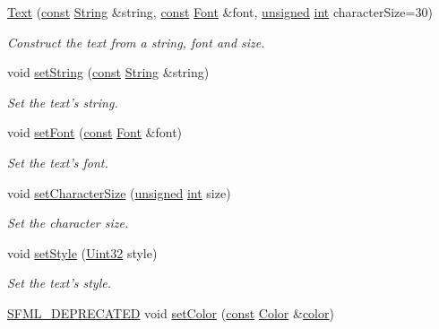 \begin{DoxyCompactItemize}
\hyperlink{classsf_1_1_text_a614019e0b5c0ed39a99d32483a51f2c5}{Text} (\hyperlink{term__entry_8h_a57bd63ce7f9a353488880e3de6692d5a}{const} \hyperlink{classsf_1_1_string}{String} \&string, \hyperlink{term__entry_8h_a57bd63ce7f9a353488880e3de6692d5a}{const} \hyperlink{classsf_1_1_font}{Font} \&font, \hyperlink{curses_8priv_8h_aca40206900cfc164654362fa8d4ad1e6}{unsigned} \hyperlink{term__entry_8h_ad65b480f8c8270356b45a9890f6499ae}{int} character\-Size=30)
\begin{DoxyCompactList}\small\item\em Construct the text from a string, font and size. \end{DoxyCompactList}\item 
void \hyperlink{classsf_1_1_text_a7d3b3359f286fd9503d1ced25b7b6c33}{set\-String} (\hyperlink{term__entry_8h_a57bd63ce7f9a353488880e3de6692d5a}{const} \hyperlink{classsf_1_1_string}{String} \&string)
\begin{DoxyCompactList}\small\item\em Set the text's string. \end{DoxyCompactList}\item 
void \hyperlink{classsf_1_1_text_a2927805d1ae92d57f15034ea34756b81}{set\-Font} (\hyperlink{term__entry_8h_a57bd63ce7f9a353488880e3de6692d5a}{const} \hyperlink{classsf_1_1_font}{Font} \&font)
\begin{DoxyCompactList}\small\item\em Set the text's font. \end{DoxyCompactList}\item 
void \hyperlink{classsf_1_1_text_ae96f835fc1bff858f8a23c5b01eaaf7e}{set\-Character\-Size} (\hyperlink{curses_8priv_8h_aca40206900cfc164654362fa8d4ad1e6}{unsigned} \hyperlink{term__entry_8h_ad65b480f8c8270356b45a9890f6499ae}{int} size)
\begin{DoxyCompactList}\small\item\em Set the character size. \end{DoxyCompactList}\item 
void \hyperlink{classsf_1_1_text_ad791702bc2d1b6590a1719aa60635edf}{set\-Style} (\hyperlink{namespacesf_aa746fb1ddef4410bddf198ebb27e727c}{Uint32} style)
\begin{DoxyCompactList}\small\item\em Set the text's style. \end{DoxyCompactList}\item 
\hyperlink{sfml_2dep_2_s_f_m_l-2_84_82_2include_2_s_f_m_l_2_config_8hpp_a9d22ae32bba2961ae9abc7e40f035fc7}{S\-F\-M\-L\-\_\-\-D\-E\-P\-R\-E\-C\-A\-T\-E\-D} void \hyperlink{classsf_1_1_text_a6ce65272d6d63ed01118366e92c68132}{set\-Color} (\hyperlink{term__entry_8h_a57bd63ce7f9a353488880e3de6692d5a}{const} \hyperlink{classsf_1_1_color}{Color} \&\hyperlink{_entity_8cpp_a864889304a90873adb9c6e289a54bcf4}{color})

\end{DoxyCompactItemize}
